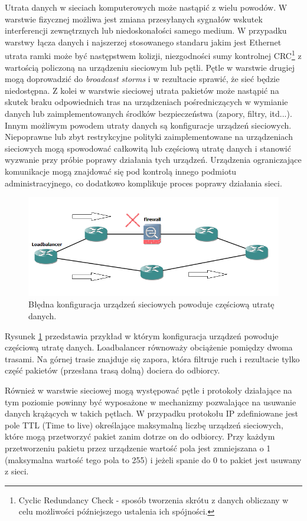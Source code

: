 Utrata danych w sieciach komputerowych może nastąpić z wielu powodów. W warstwie fizycznej możliwa jest zmiana przesyłanych sygnałów wskutek interferencji zewnętrznych lub niedoskonałości samego medium. W przypadku warstwy łącza danych i najszerzej stosowanego standaru jakim jest Ethernet utrata ramki może być następstwem kolizji, niezgodności sumy kontrolnej CRC\footnote{Cyclic Redundancy Check - sposób tworzenia skrótu z danych obliczany w celu możliwości późniejszego ustalenia ich spójności.} z wartością policzoną na urządzeniu sieciowym lub pętli. Pętle w warstwie drugiej mogą doprowadzić do \textit{broadcast storms} i w rezultacie sprawić, że sieć będzie niedostępna. Z kolei w warstwie sieciowej utrata pakietów może nastąpić na skutek braku odpowiednich tras na urządzeniach pośredniczących w wymianie danych lub zaimplementowanych środków bezpieczeństwa (zapory, filtry, itd...). Innym możliwym powodem utraty danych są konfiguracje urządzeń sieciowych. Niepoprawne lub zbyt restrykcyjne polityki zaimplementowane na urządzeniach sieciowych mogą spowodować całkowitą lub częściową utratę danych i stanowić wyzwanie przy próbie poprawy działania tych urządzeń. Urządzenia ograniczające komunikacje mogą znajdować się pod kontrolą innego podmiotu administracyjnego, co dodatkowo komplikuje proces poprawy działania sieci.
\begin{figure}[h!]
	\centering
		\includegraphics[width=0.9\linewidth]{drop}
	\caption{Błędna konfiguracja urządzeń sieciowych powoduje częściową utratę danych.}
	\label{fig:drop}
\end{figure}
Rysunek \ref{fig:drop} przedstawia przykład w którym konfiguracja urządzeń powoduje częściową utratę danych. Loadbalancer równoważy obciążenie pomiędzy dwoma trasami. Na górnej trasie znajduje się zapora, która filtruje ruch i rezultacie tylko część pakietów (przesłana trasą dolną) dociera do odbiorcy. 

Również w warstwie sieciowej mogą występować pętle i protokoły działające na tym poziomie powinny być wyposażone w mechanizmy pozwalające na usuwanie danych krążących w takich pętlach. W przypadku protokołu IP zdefiniowane jest pole TTL (Time to live) określające maksymalną liczbę urządzeń sieciowych, które mogą przetworzyć pakiet zanim dotrze on do odbiorcy. Przy każdym przetworzeniu pakietu przez urządzenie wartość pola jest zmniejszana o 1 (maksymalna wartość tego pola to 255) i jeżeli spanie do 0 to pakiet jest usuwany z sieci.

